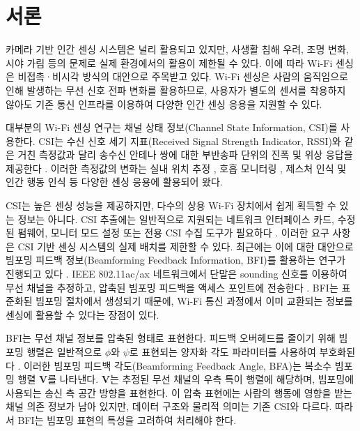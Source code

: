 \section{서론}

카메라 기반 인간 센싱 시스템은 널리 활용되고 있지만, 사생활 침해 우려,
조명 변화, 시야 가림 등의 문제로 실제 환경에서의 활용이 제한될 수 있다.
이에 따라 Wi-Fi 센싱은 비접촉·비시각 방식의 대안으로 주목받고 있다.
Wi-Fi 센싱은 사람의 움직임으로 인해 발생하는 무선 신호 전파 변화를
활용하므로, 사용자가 별도의 센서를 착용하지 않아도 기존 통신 인프라를
이용하여 다양한 인간 센싱 응용을 지원할 수 있다.

대부분의 Wi-Fi 센싱 연구는 채널 상태 정보(Channel State Information,
CSI)를 사용한다. CSI는 수신 신호 세기 지표(Received Signal Strength
Indicator, RSSI)와 같은 거친 측정값과 달리 송수신 안테나 쌍에 대한
부반송파 단위의 진폭 및 위상 응답을 제공한다 \cite{halperin2011tool}.
이러한 측정값의 변화는 실내 위치 추정 \cite{kotaru2015spotfi}, 호흡
모니터링 \cite{wang2017tensorbeat}, 제스처 인식 \cite{zheng2019widar3} 및
인간 행동 인식 \cite{wang2015understanding} 등 다양한 센싱 응용에 활용되어
왔다.

CSI는 높은 센싱 성능을 제공하지만, 다수의 상용 Wi-Fi 장치에서 쉽게
획득할 수 있는 정보는 아니다. CSI 추출에는 일반적으로 지원되는 네트워크
인터페이스 카드, 수정된 펌웨어, 모니터 모드 설정 또는 전용 CSI 수집 도구가
필요하다 \cite{gringoli2019free}. 이러한 요구 사항은 CSI 기반 센싱
시스템의 실제 배치를 제한할 수 있다. 최근에는 이에 대한 대안으로 빔포밍
피드백 정보(Beamforming Feedback Information, BFI)를 활용하는 연구가
진행되고 있다 \cite{beamsense2023,bfmsense2024,beamsense2025,wibfi2023}.
IEEE 802.11ac/ax 네트워크에서 단말은 sounding 신호를 이용하여 무선
채널을 추정하고, 압축된 빔포밍 피드백을 액세스 포인트에 전송한다
\cite{ieee2021ax,ieee2013ac}. BFI는 표준화된 빔포밍 절차에서 생성되기
때문에, Wi-Fi 통신 과정에서 이미 교환되는 정보를 센싱에 활용할 수 있다는
장점이 있다.

BFI는 무선 채널 정보를 압축된 형태로 표현한다. 피드백 오버헤드를 줄이기
위해 빔포밍 행렬은 일반적으로 $\phi$와 $\psi$로 표현되는 양자화 각도
파라미터를 사용하여 부호화된다 \cite{itahara2022beamforming,li2024efficient}.
이러한 빔포밍 피드백 각도(Beamforming Feedback Angle, BFA)는 복소수
빔포밍 행렬 $\mathbf{V}$를 나타낸다. $\mathbf{V}$는 추정된 무선 채널의
우측 특이 행렬에 해당하며, 빔포밍에 사용되는 송신 측 공간 방향을 표현한다.
이 압축 표현에는 사람의 행동에 영향을 받는 채널 의존 정보가 남아 있지만,
데이터 구조와 물리적 의미는 기존 CSI와 다르다. 따라서 BFI는 빔포밍 표현의
특성을 고려하여 처리해야 한다.


